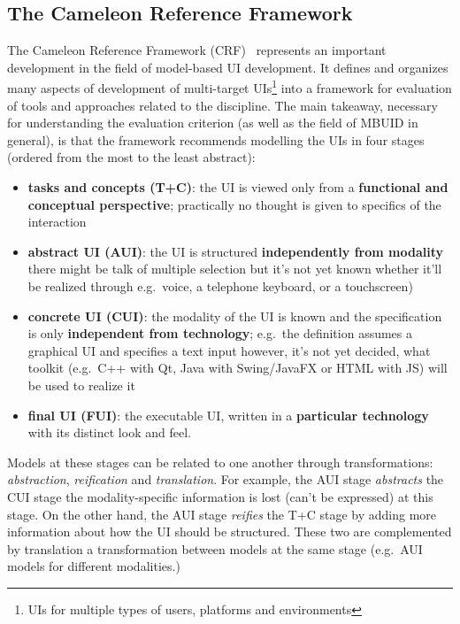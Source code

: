\subsection{The Cameleon Reference Framework}\label{subsec:the-cameleon-reference-framework}

The Cameleon Reference Framework (CRF)~\cite{calvary_cameleon_framework_2002, calvary_cameleon_glossary_2002} represents an important development in the field of model-based UI development.
It defines and organizes many aspects of development of multi-target UIs\footnote{UIs for multiple types of users, platforms and environments} into a framework for evaluation of tools and approaches related to the discipline.
The main takeaway, necessary for understanding the evaluation criterion (as well as the field of MBUID in general), is that the framework recommends modelling the UIs in four stages (ordered from the most to the least abstract):
\begin{itemize}
    \item \textbf{tasks and concepts (T+C)}: the UI is viewed only from a \textbf{functional and conceptual perspective};
    practically no thought is given to specifics of the interaction
    \item \textbf{abstract UI (AUI)}: the UI is structured \textbf{independently from modality}\,\textendash\,there might be talk of multiple selection but it's not yet known whether it'll be realized through e.g.\ voice, a telephone keyboard, or a touchscreen)
    \item \textbf{concrete UI (CUI)}: the modality of the UI is known and the specification is only \textbf{independent from technology};
    e.g.\ the definition assumes a graphical UI and specifies a text input\,\textendash\,however, it's not yet decided, what toolkit (e.g.\ C++ with Qt, Java with Swing/JavaFX or HTML with JS) will be used to realize it
    \item \textbf{final UI (FUI)}: the executable UI, written in a \textbf{particular technology} with its distinct look and feel.
\end{itemize}
Models at these stages can be related to one another through transformations: \emph{abstraction}, \emph{reification} and \emph{translation}.
For example, the AUI stage \emph{abstracts} the CUI stage\,\textendash\,the modality-specific information is lost (can't be expressed) at this stage.
On the other hand, the AUI stage \emph{reifies} the T+C stage by adding more information about how the UI should be structured.
These two are complemented by translation\,\textendash\,a transformation between models at the same stage (e.g.\ AUI models for different modalities.)

